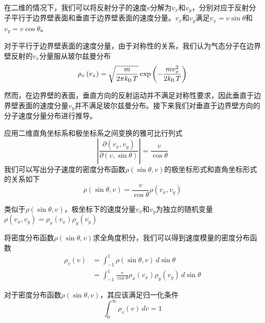     在二维的情况下，我们可以将反射分子的速度$v$分解为$v_x$和$v_y$，分别对应于反射分子平行于边界壁表面和垂直于边界壁表面的速度分量。$v_x$和$v_y$满足$v_x=v\sin\theta$和$v_y=v\cos\theta$。

    对于平行于边界壁表面的速度分量，由于对称性的关系，我们认为气态分子在边界壁反射的$v_x$分量服从玻尔兹曼分布\chinesecolon
    \begin{equation}
        \label{eq:FM_vxDensity}
        \rho_x\left(v_x\right)=\sqrt{\frac{m}{2\pi\it k_{\rm B} \it T}}\exp\left({-\frac{mv_x^2}{2\it k_{\rm B} \it T}}\right)
    \end{equation}

    然而，在边界壁的表面，垂直方向的反射运动并不满足对称性要求，因此垂直于边界壁表面的速度分量$v_y$并不满足玻尔兹曼分布。接下来我们对垂直于边界壁方向的分子速度分量分布进行推导。
    
    应用二维直角坐标系和极坐标系之间变换的雅可比行列式\chinesecolon
    \begin{equation}
        \left\lvert \frac{\partial \left(v_x,v_y\right)}{\partial \left(v,\sin\theta\right)}\right\rvert=\frac{v}{\cos\theta}
    \end{equation}
    我们可以写出分子速度的密度分布函数$\rho\left(\sin\theta,v\right)$的极坐标形式和直角坐标形式的关系如下\chinesecolon
    \[
        \rho\left(\sin\theta, v\right)=\frac{v}{\cos\theta}\rho\left(v_x,v_y\right)
    \]

    类似于$\rho\left(\sin\theta,v\right)$，极坐标下的速度分量$v_x$和$v_y$为独立的随机变量$\rho\left(v_x,v_y\right)=\rho_x\left(v_x\right)\rho_y\left(v_y\right)$

    将密度分布函数$\rho\left(\sin\theta,v\right)$求全角度积分，我们可以得到速度模量的密度分布函数
    \begin{equation}
        \label{eq:FM_vDensity}
        \begin{split}
            \rho_v\left(v\right)&=\int_{-1}^{1} \rho\left(\sin\theta,v\right) \,d\sin\theta \\[+1ex]
            &= \int_{-1}^{1} \frac{v}{\cos\theta} \rho_x\left(v_x\right)\rho_y\left(v_y\right) \,d\sin\theta
        \end{split}
    \end{equation}

    对于密度分布函数$\rho\left(\sin\theta,v\right)$，其应该满足归一化条件\chinesecolon
    \begin{equation}
        \label{eq:FM_normalze_vDensity}
        \int_{0}^{\infty} \rho_v\left(v\right) \,dv = 1
    \end{equation}
    
